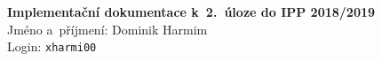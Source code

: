 \documentclass[11pt, a4paper]{article}
\begin{document}
    {\parindent 0pt \Large
        \textbf{Implementační dokumentace k~2.~úloze do IPP 2018/2019} \\
        Jméno a~příjmení: Dominik Harmim \\
        Login: \texttt{xharmi00}
    }
\end{document}
